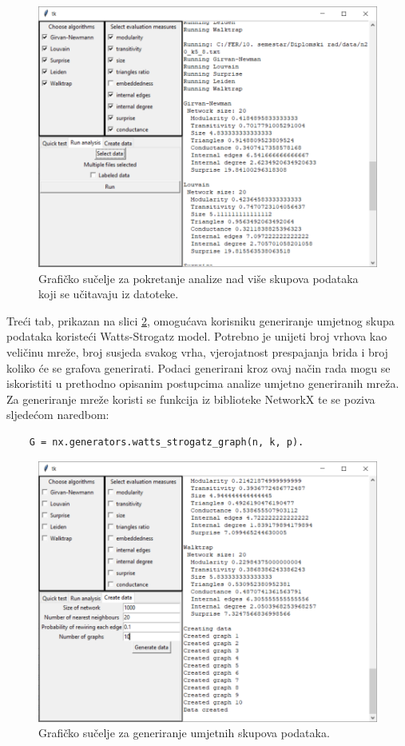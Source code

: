 \documentclass[times, utf8, diplomski]{fer}
\begin{document}
\begin{figure}
	\includegraphics[width=\linewidth]{images/gui-analysis.png}
	\caption{Grafičko sučelje za pokretanje analize nad više skupova podataka koji se učitavaju iz datoteke.}
	\label{fig:gui2}
\end{figure}


Treći tab, prikazan na slici \ref{fig:gui3}, omogućava korisniku generiranje umjetnog skupa podataka koristeći Watts-Strogatz model. Potrebno je unijeti broj vrhova kao veličinu mreže, broj susjeda svakog vrha, vjerojatnost prespajanja brida i broj koliko će se grafova generirati. Podaci generirani kroz ovaj način rada mogu se iskoristiti u prethodno opisanim postupcima analize umjetno generiranih mreža. Za generiranje mreže koristi se funkcija iz biblioteke NetworkX te se poziva sljedećom naredbom:
\begin{verbatim}
	G = nx.generators.watts_strogatz_graph(n, k, p).
\end{verbatim}


\begin{figure}
	\includegraphics[width=\linewidth]{images/gui-generating.png}
	\caption{Grafičko sučelje za generiranje umjetnih skupova podataka.}
	\label{fig:gui3}
\end{figure}
\end{document}
